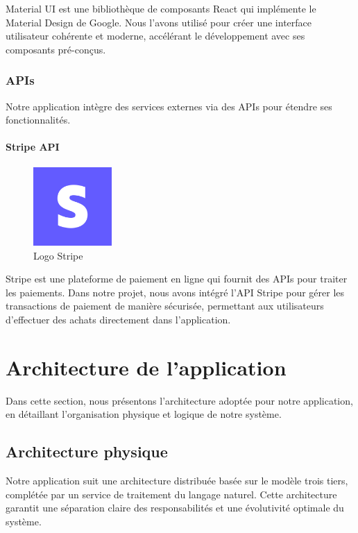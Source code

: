 \noindent Material UI \cite{mui} est une bibliothèque de composants React qui implémente le Material Design de Google. Nous l'avons utilisé pour créer une interface utilisateur cohérente et moderne, accélérant le développement avec ses composants pré-conçus.

\subsubsection{APIs}

\noindent Notre application intègre des services externes via des APIs pour étendre ses fonctionnalités.

\paragraph{Stripe API}

\begin{figure}[H]
    \centering
    \includegraphics[width=3cm, height=3cm]{images/stripe.png}
    \caption{Logo Stripe}
\end{figure}

\noindent Stripe \cite{stripe} est une plateforme de paiement en ligne qui fournit des APIs pour traiter les paiements. Dans notre projet, nous avons intégré l'API Stripe pour gérer les transactions de paiement de manière sécurisée, permettant aux utilisateurs d'effectuer des achats directement dans l'application.

\section{Architecture de l'application}

\noindent Dans cette section, nous présentons l'architecture adoptée pour notre application, en détaillant l'organisation physique et logique de notre système.

\subsection{Architecture physique}

\noindent Notre application suit une architecture distribuée basée sur le modèle trois tiers, complétée par un service de traitement du langage naturel. Cette architecture garantit une séparation claire des responsabilités et une évolutivité optimale du système.

